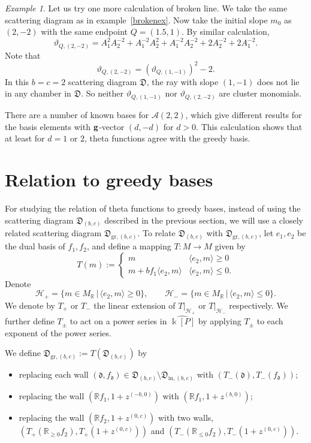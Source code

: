 \documentclass[12pt]{amsart}
\theoremstyle{remark}
\newtheorem{example}[theorem]{Example}
\newcommand{\RR}{\mathbb{R}}
\newcommand{\cA}{\mathcal{A}}
\newcommand{\fod}{\mathfrak{d}}
\newcommand{\DD}{\mathfrak{D}}
\newcommand{\gr}{\mathrm{gr}}
\begin{document}
\begin{example} 
Let us try one more calculation of broken line. We take the same scattering diagram as in example~\ref{brokenex}. Now take the initial slope $m_0$ as $(2,-2)$ with the same endpoint $Q= (1.5,1)$. By similar calculation, 
\[ \vartheta _{Q, (2,-2)}= A_1^2 A_2^{-2} + A_1^{-2}A_2^2 + A_1^{-2}A_2^{-2} + 2 A_2^{-2} + 2A_1^{-2}.  \]
Note that 
\[ \vartheta _{Q, (2,-2)} = (\vartheta_{Q,(1,-1)}) ^2 -2. \]
In this $b=c=2$ scattering diagram $\DD$, the ray with slope $(1,-1)$ does not lie in any chamber in $\DD$. So neither $\vartheta_{Q,(1,-1)}$ nor 
$\vartheta _{Q, (2,-2)}$ are cluster monomials.

There are a number of known bases for $\cA(2,2)$, which give different results
for the basis elements with ${\bf g}$-vector $(d,-d)$ for $d>0$. This
calculation shows that at least for $d=1$ or $2$, theta functions agree
with the greedy basis.
\end{example}


\section{Relation to greedy bases}

For studying the relation of theta functions to greedy bases,
instead of using the scattering diagram $\DD_{(b,c)}$ described in the
previous section, we will use a closely related scattering diagram 
$\DD_{\mathrm{gr},(b,c)}$.
To relate $\DD_{(b,c)}$ with $\DD_{\gr,(b,c)}$, let $e_1,e_2$ be the
dual basis of $f_1, f_2$, and define a mapping 
$T:M \rightarrow M$ given by
\[
T (m) := 
\begin{cases}
    m   & \langle e_2 , m \rangle \geq 0 \\
    m + b f_1 \langle e_2, m \rangle & \langle e_2, m \rangle \leq 0.
\end{cases}
\]
Denote
\[ \mathcal{H}_{+} = \{  m \in M_{\mathbb{R}}\, |\, \langle e_2 , m \rangle \geq 0  \}, \qquad \mathcal{H}_{-} = \{  m \in M_{\mathbb{R}} \,|\, \langle e_2 , m \rangle \leq 0  \}.\]
We denote by $T_+$ or $T_-$ the linear extension of $T|_{\mathcal{H}_+}$
or $T|_{\mathcal{H}_-}$ respectively.
We further define $T_{\pm}$ to act on a power 
series in $\widehat{\Bbbk[P]}$ by applying $T_{\pm}$ to each exponent of the 
power series. 

We define $\DD_{\gr,(b,c)} := T(\DD_{(b,c)})$ by 
\begin{itemize}
    \item replacing each wall $(\fod,f_{\fod})\in \DD_{(b,c)}\setminus
\DD_{\mathrm{in},(b,c)}$ with $(T_-(\fod), T_-(f_{\fod}))$;
    \item replacing the wall $(\RR f_1, 1+z^{(-b,0)})$ with 
$(\RR f_1, 1+z^{(b,0)})$;
    \item replacing the wall $(\RR f_2, 1+z^{(0,c)})$ with two walls,
$(T_+(\RR_{\ge 0} f_2), T_+(1+z^{(0,c)}))$ and $(T_-(\RR_{\le 0}f_2),
T_-(1+z^{(0,c)}))$.
\end{itemize}
\end{document}
